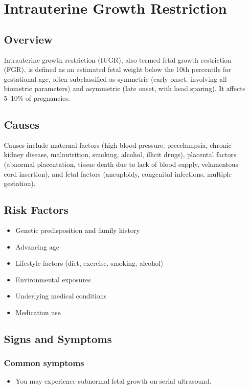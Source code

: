 \chapter{Intrauterine Growth Restriction}
\label{sec:Intrauterine Growth Restriction}

\section{Overview}
Intrauterine growth restriction (IUGR), also termed fetal growth restriction (FGR), is defined as an estimated fetal weight below the 10th percentile for gestational age, often subclassified as symmetric (early onset, involving all biometric parameters) and asymmetric (late onset, with head sparing). It affects 5--10\% of pregnancies.
\section{Causes}
Causes include maternal factors (high blood pressure, preeclampsia, chronic kidney disease, malnutrition, smoking, alcohol, illicit drugs), placental factors (abnormal placentation, tissue death due to lack of blood supply, velamentous cord insertion), and fetal factors (aneuploidy, congenital infections, multiple gestation).     
\section{Risk Factors}

\begin{itemize}[noitemsep]
  \item Genetic predisposition and family history
  \item Advancing age
  \item Lifestyle factors (diet, exercise, smoking, alcohol)
  \item Environmental exposures
  \item Underlying medical conditions
  \item Medication use
\end{itemize}
\section{Signs and Symptoms}

\subsection{Common symptoms}
\begin{itemize}[noitemsep]
  \item You may experience subnormal fetal growth on serial ultrasound. 
  \end{itemize}

